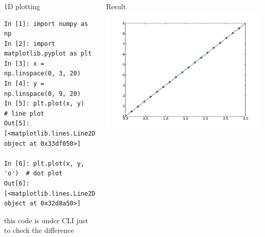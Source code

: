 \documentclass[colorlinks]{beamer}
\begin{document}
\begin{frame}[fragile]\frametitle{}
\begin{columns}[c]
\begin{block}{1D plotting }
\tiny
\begin{verbatim}
In [1]: import numpy as np 
In [2]: import matplotlib.pyplot as plt 
In [3]: x = np.linspace(0, 3, 20) 
In [4]: y = np.linspace(0, 9, 20) 
In [5]: plt.plot(x, y)       # line plot     
Out[5]: [<matplotlib.lines.Line2D object at 0x33df050>]

In [6]: plt.plot(x, y, 'o')  # dot plot     
Out[6]: [<matplotlib.lines.Line2D object at 0x32d8a50>]

\end{verbatim}

this code is under CLI just to check the difference
\end{block}

\begin{block}{Result}
\includegraphics[width=\textwidth]{plwfigis/CursP_2_figure2}

\end{block}
\end{columns}
\end{frame}
\end{document}
